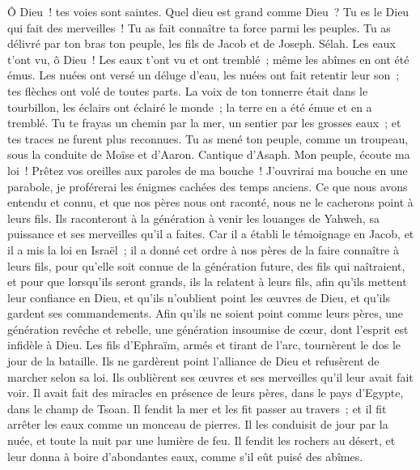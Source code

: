 \begin{multicols}{2}
Ô Dieu~! tes voies sont saintes. Quel dieu est grand comme Dieu~?
Tu es le Dieu qui fait des merveilles~! Tu as fait connaître ta force parmi les peuples.
Tu as délivré par ton bras ton peuple, les fils de Jacob et de Joseph. Sélah.
Les eaux t'ont vu, ô Dieu~! Les eaux t'ont vu et ont tremblé~; même les abîmes en ont été émus.
Les nuées ont versé un déluge d'eau, les nuées ont fait retentir leur son~; tes flèches ont volé de toutes parts.
La voix de ton tonnerre était dans le tourbillon, les éclairs ont éclairé le monde~; la terre en a été émue et en a tremblé.
Tu te frayas un chemin par la mer, un sentier par les grosses eaux~; et tes traces ne furent plus reconnues.
Tu as mené ton peuple, comme un troupeau, sous la conduite de Moïse et d'Aaron.
\VerseOne{}Cantique d'Asaph. Mon peuple, écoute ma loi~! Prêtez vos oreilles aux paroles de ma bouche~!
J'ouvrirai ma bouche en une parabole, je proférerai les énigmes cachées des temps anciens.
Ce que nous avons entendu et connu, et que nos pères nous ont raconté,
nous ne le cacherons point à leurs fils. Ils raconteront à la génération à venir les louanges de Yahweh, sa puissance et ses merveilles qu'il a faites.
Car il a établi le témoignage en Jacob, et il a mis la loi en Israël~; il a donné cet ordre à nos pères de la faire connaître à leurs fils,
pour qu'elle soit connue de la génération future, des fils qui naîtraient, et pour que lorsqu'ils seront grands, ils la relatent à leurs fils,
afin qu'ils mettent leur confiance en Dieu, et qu'ils n'oublient point les œuvres de Dieu, et qu'ils gardent ses commandements.
Afin qu'ils ne soient point comme leurs pères, une génération revêche et rebelle, une génération insoumise de cœur, dont l'esprit est infidèle à Dieu.
Les fils d'Ephraïm, armés et tirant de l'arc, tournèrent le dos le jour de la bataille.
Ils ne gardèrent point l'alliance de Dieu et refusèrent de marcher selon sa loi.
Ils oublièrent ses œuvres et ses merveilles qu'il leur avait fait voir.
Il avait fait des miracles en présence de leurs pères, dans le pays d'Egypte, dans le champ de Tsoan.
Il fendit la mer et les fit passer au travers~; et il fit arrêter les eaux comme un monceau de pierres.
Il les conduisit de jour par la nuée, et toute la nuit par une lumière de feu.
Il fendit les rochers au désert, et leur donna à boire d'abondantes eaux, comme s'il eût puisé des abîmes.

\end{multicols}
